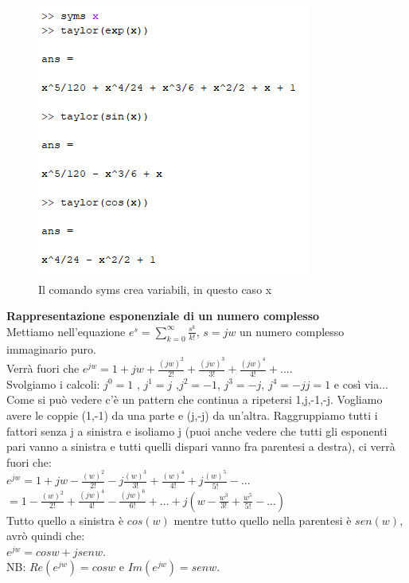 \begin{figure}[h]
	\centering
	\includegraphics{immagini/comando1}
	\caption{ Il comando syms crea variabili, in questo caso x }
	\label{fig: Primo comando Matlab}
\end{figure}

\textbf{Rappresentazione esponenziale di un numero complesso}\\
Mettiamo nell'equazione $ e^s = \sum_{k=0}^\infty \frac{s^k}{k!}$, $s=jw$ un numero complesso immaginario puro.\\
Verrà fuori che $ e^{jw} = 1 + jw + \frac{(jw)^2}{2!}+ \frac{(jw)^3}{3!}+ \frac{(jw)^4}{4!}+... $.\\
Svolgiamo i calcoli: $ j^0 = 1$ , $ j^1 = j $ ,$j^2=-1 $, $ j^3=-j $, $j^4 = -jj= 1$ e così via...\\
Come si può vedere c'è un pattern che continua a ripetersi 1,j,-1,-j. Vogliamo avere le coppie (1,-1) da una parte e (j,-j) da un'altra. Raggruppiamo tutti i fattori senza j a sinistra e isoliamo j (puoi anche vedere che tutti gli esponenti pari vanno a sinistra e tutti quelli dispari vanno fra parentesi a destra), ci verrà fuori che: \\
$ e^{jw} = 1 +jw-\frac{(w)^2}{2!} -j\frac{(w)^3}{3!}+\frac{(w)^4}{4!}+j\frac{(w)^5}{5!}-... $\\
$ = 1-\frac{(w)^2}{2!}+\frac{(jw)^4}{4!}-\frac{(jw)^6}{6!}+...+j(w - \frac{w^3}{3!}+\frac{w^5}{5!}-...)$\\
Tutto quello a sinistra è $ cos(w) $ mentre tutto quello nella parentesi è $ sen(w)$, avrò quindi che:\\
$ e^{jw} = cosw +jsenw$.\\
NB: $ Re(e^{jw}) = cosw $ e $ Im(e^{jw}) = senw$.\\

